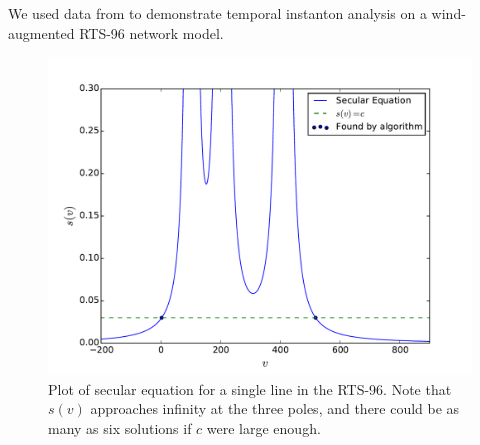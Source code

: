 \documentclass[conference]{IEEEtran}
\begin{document}
We used data from \cite{pandzic} to demonstrate temporal instanton
analysis on a wind-augmented RTS-96 network model. 


\begin{figure}[t]
\centering
\includegraphics[trim=0in 0in 0.5in 0.5in,clip,width=1\linewidth]{images/secular}
\caption{Plot of secular equation for a single line in the RTS-96. Note that $s(v)$ approaches infinity at the three poles, and there could be as many as six solutions if $c$ were large enough.}
\label{fig:secular}
\end{figure}

\end{document}
